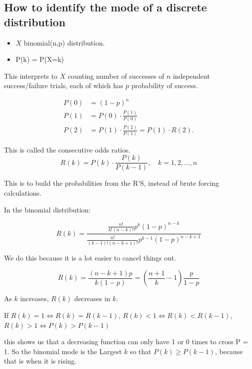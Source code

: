 \documentclass{report}
\begin{document}

\subsection{How to identify the mode of a discrete distribution}
\begin{itemize}
	\item  $X$ binomial(n,p) distribution.
	\item P(k) = P(X=k)
\end{itemize}

This interprets to $X$ counting number of successes of $n$ independent success/failure trials, each of which has $p$ probability of success. 

\begin{align*}
	P(0) &= (1-p)^n	\\
	P(1) &= P(0) \cdot \frac{P(1)}{P(0)}\\
	P(2) &= P(1) \cdot \frac{P(2)}{P(1)} = P(1) \cdot R(2) 
.\end{align*}

This is called the consecutive odds ratios. 
\[R(k) = P(k) \cdot \frac{P(k)}{P(k-1)}, \quad k=1,2,\dots,n\] 

This is to build the probabilities from the R'S, instead of brute forcing calculations. 

In the binomial distribution: 

\[R(k) = \frac{\frac{n!}{k! (n-k)!}p^k(1-p)^{n-k}}{\frac{n!}{(k-1)!(n-k+1)!}p^{k-1}(1-p)^{n-k+1}}\]

We do this because it is a lot easier to cancel things out. 

\[R(k) = \frac{(n-k+1)p}{k(1-p)} = \left( \frac{n+1}{k} -1 \right) \frac{p}{1-p}\]

As $k$ increases, $R(k)$ decreases in $k$. 



If $R(k) = 1 \iff R(k) = R(k-1)$, $R(k) < 1 \iff R(k) < R(k-1)$, $R(k) > 1 \iff P(k) > P(k-1)$ 	

this shows us that a decreasing function can only have 1 or 0 times to cross P = 1. So the binomial mode is the Largest $k$ so that $P(k) \geq P(k-1)$, because that is when it is rising. 
\end{document}
